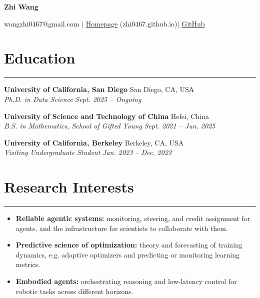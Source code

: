 \documentclass[11pt]{article}
\begin{document}
{\centering \textbf{\huge Zhi Wang} \par}
{\centering wangzhi0467@gmail.com $\vert$ \href{https://zhi0467.github.io}{Homepage} (zhi0467.github.io)$\vert$ \href{https://github.com/Zhi0467}{GitHub}\par}
\vspace{0.1em}

\section*{Education}
\hrule
\noindent
\textbf{University of California, San Diego} \hfill  San Diego, CA, USA\\
\textit{Ph.D. in Data Science} \hfill \textit{Sept. 2025 -- Ongoing}

\noindent
\textbf{University of Science and Technology of China} \hfill Hefei, China \\
\textit{B.S. in Mathematics, School of Gifted Young} \hfill \textit{Sept. 2021 -- Jun. 2025}

\noindent
\textbf{University of California, Berkeley} \hfill Berkeley, CA, USA \\
\textit{Visiting Undergraduate Student} \hfill \textit{Jan. 2023 -- Dec. 2023}

\vspace{0.2em}

\section*{Research Interests}
\hrule
\begin{itemize}[leftmargin=1.5em, topsep=2pt, partopsep=0pt, itemsep=0pt, parsep=0pt]
    \item \textbf{Reliable agentic systems:} monitoring, steering, and credit assignment for agents, and the infrastructure for scientists to collaborate with them.
    \item \textbf{Predictive science of optimization:} theory and forecasting of training dynamics, e.g. adaptive optimizers and predicting or monitoring learning metrics.
    \item \textbf{Embodied agents:} orchestrating reasoning and low-latency control for robotic tasks across different horizons.
\end{itemize}
\end{document}
